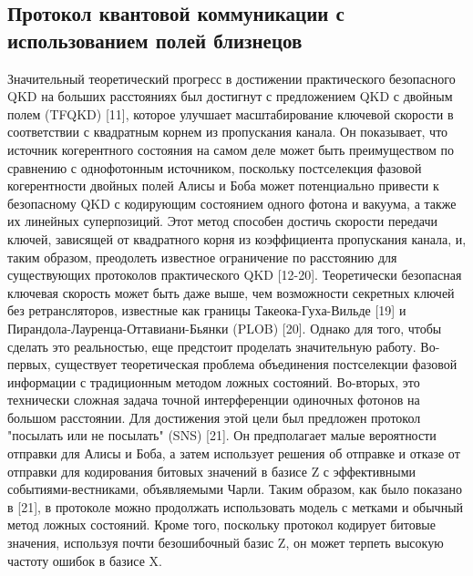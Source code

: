 \subsection {Протокол квантовой коммуникации с использованием полей близнецов}\label{sec:ch1/sect2/TF QKD lit}
Значительный теоретический прогресс в достижении практического безопасного QKD на больших расстояниях был достигнут с предложением QKD с двойным полем (TFQKD) [11], которое улучшает масштабирование ключевой скорости в соответствии с квадратным корнем из пропускания канала. Он показывает, что источник когерентного состояния на самом деле может быть преимуществом по сравнению с однофотонным источником, поскольку постселекция фазовой когерентности двойных полей Алисы и Боба может потенциально привести к безопасному QKD с кодирующим состоянием одного фотона и вакуума, а также их линейных суперпозиций. Этот метод способен достичь скорости передачи ключей, зависящей от квадратного корня из коэффициента пропускания канала, и, таким образом, преодолеть известное ограничение по расстоянию для существующих протоколов практического QKD [12-20]. Теоретически безопасная ключевая скорость может быть даже выше, чем возможности секретных ключей без ретрансляторов, известные как границы Такеока-Гуха-Вильде [19] и Пирандола-Лауренца-Оттавиани-Бьянки (PLOB) [20]. Однако для того, чтобы сделать это реальностью, еще предстоит проделать значительную работу. Во-первых, существует теоретическая проблема объединения постселекции фазовой информации с традиционным методом ложных состояний. Во-вторых, это технически сложная задача точной интерференции одиночных фотонов на большом расстоянии. Для достижения этой цели был предложен протокол "посылать или не посылать" (SNS) [21]. Он предполагает малые вероятности отправки для Алисы и Боба, а затем использует решения об отправке и отказе от отправки для кодирования битовых значений в базисе Z с эффективными событиями-вестниками, объявляемыми Чарли. Таким образом, как было показано в [21], в протоколе можно продолжать использовать модель с метками и обычный метод ложных состояний. Кроме того, поскольку протокол кодирует битовые значения, используя почти безошибочный базис Z, он может терпеть высокую частоту ошибок в базисе X. 
